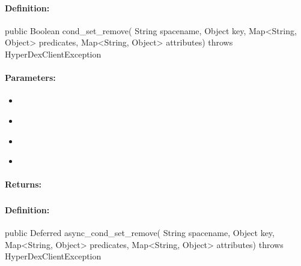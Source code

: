 \paragraph{Definition:}
\begin{javacode}
public Boolean cond_set_remove(
        String spacename,
        Object key,
        Map<String, Object> predicates,
        Map<String, Object> attributes) throws HyperDexClientException
\end{javacode}

\paragraph{Parameters:}
\begin{itemize}[noitemsep]
\item {}\\

\item {}\\

\item {}\\

\item {}\\

\end{itemize}

\paragraph{Returns:}


\pagebreak
\subsubsection{}
\label{api:java:async_cond_set_remove}


\paragraph{Definition:}
\begin{javacode}
public Deferred async_cond_set_remove(
        String spacename,
        Object key,
        Map<String, Object> predicates,
        Map<String, Object> attributes) throws HyperDexClientException
\end{javacode}

